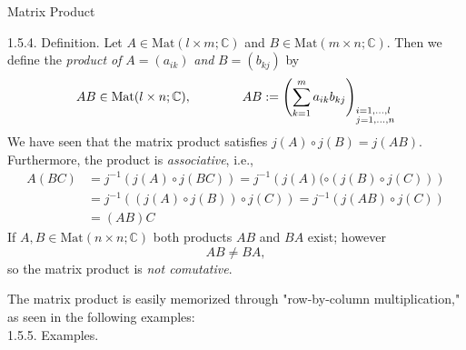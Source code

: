 \documentclass[smaller,hyperref={CJKbookmarks=true}]{beamer}
\newcommand{\C}{\mathbb{C}} \newcommand{\F}{\mathbb{F}} \newcommand{\R}{\mathbb{R}} \newcommand{\Q}{\mathbb{Q}}
\begin{document}
\begin{frame}{Matrix Product}
\begin{spacing}{0.8}
\alert{1.5.4. Definition.} Let $A\in\text{Mat}(l\times m;\C)$ and $B\in\text{Mat}(m\times n;\C)$. Then we define the \emph{product of} $A=(a_{ik})$ \emph{and} $B=(b_{kj})$ by
\[AB\in\text{Mat}(l\times n;\C),\qquad\qquad AB:=\left(\sum_{k=1}^{m}a_{ik}b_{kj}\right)_{\begin{subarray}
                                               ~i=1,\ldots,l\\j=1,\ldots,n
                                             \end{subarray}}\]
We have seen that the matrix product satisfies $j(A)\circ j(B)=j(AB)$. Furthermore, the product is \emph{associative}, i.e.,
\begin{equation*}
  \begin{split}
     A(BC) &=j^{-1}\left(j(A)\circ j(BC)\right)=j^{-1}\left(j(A)(\circ(j(B)\circ j(C))\right)  \\
           &=j^{-1}\left((j(A)\circ j(B))\circ j(C)\right)=j^{-1}\left(j(AB)\circ j(C)\right)  \\
           &=(AB)C
  \end{split}
\end{equation*}
If $A,B\in\text{Mat}(n\times n;\C)$ both products $AB$ and $BA$ exist; however
\[AB\neq BA,\] so the matrix product is \emph{not comutative}.
\end{spacing}
\newpage
\begin{spacing}{1.1}
The matrix product is easily memorized through "row-by-column multiplication," as seen in the following examples:\\
\alert{1.5.5. Examples.}
\end{spacing}
\end{frame}
\end{document}
